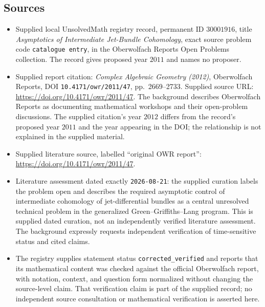 \documentclass[11pt]{article}
\begin{document}
\subsection{Sources}
\begin{itemize}
\item Supplied local UnsolvedMath registry record, permanent ID \(30001916\), title \emph{Asymptotics of Intermediate Jet-Bundle Cohomology}, exact source problem code \texttt{catalogue entry}, in the Oberwolfach Reports Open Problems collection. The record gives proposed year \(2011\) and names no proposer.
\item Supplied report citation: \emph{Complex Algebraic Geometry (2012)}, Oberwolfach Reports, DOI \texttt{10.4171/owr/2011/47}, pp.\ 2669--2733. Supplied source URL: \url{https://doi.org/10.4171/owr/2011/47}. The background describes Oberwolfach Reports as documenting mathematical workshops and their open-problem discussions. The supplied citation's year \(2012\) differs from the record's proposed year \(2011\) and the year appearing in the DOI; the relationship is not explained in the supplied material.
\item Supplied literature source, labelled ``original OWR report'': \url{https://doi.org/10.4171/owr/2011/47}.
\item Literature assessment dated exactly \texttt{2026-08-21}: the supplied curation labels the problem open and describes the required asymptotic control of intermediate cohomology of jet-differential bundles as a central unresolved technical problem in the generalized Green--Griffiths--Lang program. This is supplied dated curation, not an independently verified literature assessment. The background expressly requests independent verification of time-sensitive status and cited claims.
\item The registry supplies statement status \texttt{corrected\_verified} and reports that its mathematical content was checked against the official Oberwolfach report, with notation, context, and question form normalized without changing the source-level claim. That verification claim is part of the supplied record; no independent source consultation or mathematical verification is asserted here.
\end{itemize}
\end{document}
